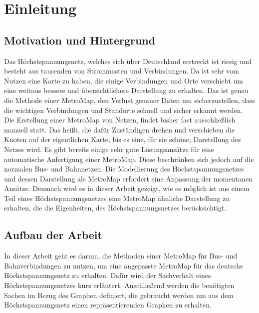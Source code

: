 
\chapter{Einleitung}
\label{Einleitung}

\section{Motivation und Hintergrund}
\label{Motivation_und_Hintergrund}
%
Das Höchstspannungsnetz, welches sich über Deutschland erstreckt ist riesig und besteht aus tausenden von Strommasten und Verbindungen. Da ist sehr vom Nutzen eine Karte zu haben, die einige Verbindungen und Orte verschiebt um eine weitaus bessere und übersichtlichere Darstellung zu erhalten. Das ist genau die Methode einer MetroMap, den Verlust genauer Daten um sicherzustellen, dass die wichtigen Verbindungen und Standorte schnell und sicher erkannt werden.\\

Die Erstellung einer MetroMap von Netzen, findet bisher fast ausschließlich manuell statt. Das heißt, die dafür Zuständigen drehen und verschieben die Knoten auf der eigentlichen Karte, bis es eine, für sie schöne, Darstellung des Netzes wird. Es gibt bereits einige sehr gute Lösungsansätze für eine automatische Anfertigung einer MetroMap. Diese beschränken sich jedoch auf die normalen Bus- und Bahnnetzen. Die Modellierung des Höchstspannungsnetzes und dessen Darstellung als MetroMap erfordert eine Anpassung der momentanen Ansätze. Demnach wird es in dieser Arbeit gezeigt, wie es möglich ist aus einem Teil eines Höchstspannungsnetzes eine MetroMap ähnliche Darstellung zu erhalten, die die Eigenheiten, des Höchstspannungsnetzes berücksichtigt.




\section{Aufbau der Arbeit}
\label{Aufbau_der_Arbeit}
%
In dieser Arbeit geht es darum, die Methoden einer MetroMap für Bus- und Bahnverbindungen zu nutzen, um eine angepasste MetroMap für das deutsche Höchstspannungsnetz zu erhalten. Dafür wird der Sachverhalt eines Höchstspannungsnetzes kurz erläutert. Anschließend werden die benötigten Sachen im Bezug des Graphen definiert, die gebraucht werden um aus dem Höchstspannungsnetz einen repräsentierenden Graphen zu erhalten. \\

